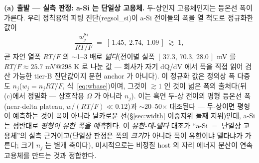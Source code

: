 \textbf{(a) 출발 --- 실측 판정: a-Si 는 단일상 고용체.} 두-상인지 고용체인지는 등온선 폭이 가른다. 우리 정칙용액
피팅 진단(regsol\_si)이 a-Si 전이들의 폭을 열 척도로 정규화한 값이
\begin{equation}
\frac{w_j^{\mathrm{Si}}}{RT/F}\;=\;[\,1.45,\;2.74,\;1.09\,]\;\gtrsim\;1,
\label{eq:sifr-width}
\end{equation}
곧 자연 열폭 $RT/F$ 의 $\sim$1--3 배로 \emph{넓다}(전이별 실폭 $[\,37.3,\,70.3,\,28.0\,]$ mV 를
$RT/F\!\approx\!25.7$ mV$@298$ K 로 나눈 값 --- 회사가 자기 dQ/dV 에서 폭을 직접 읽어 검산 가능한
tier-B 진단값이지 문헌 anchor 가 아니다). 이 정규화 값은 정의상 폭 다중도 $n_j$($w_j{=}n_jRT/F$,
식~\eqref{eq:wbase})이며, 그것이 $\gtrsim1$ 인 것이 넓은 폭의 출처다(뒤 (c)에서 정밀화 --- 상호작용 $\Omega$ 가
아니라 $n_j$). 이는 흑연 두-상 전이의 평형 등온선 폭(near-delta plateau, $w/(RT/F)\!\ll\!0.12$)과 $\sim$20--50$\times$
대조된다 --- 두-상이면 평형이 예측하는 것이 폭이 아니라 날카로운 선(\S\ref{sec:width} 이중지위 둘째 지위)인데,
a-Si 는 정반대로 \emph{평형이 유한 폭을 예측}한다. 이 \emph{유한-대-델타} 대조가 ``a-Si $=$ 단일상 고용체''의
실측 근거이고(단일상 판정은 폭의 \emph{크기}가 아니라 폭이 유한이냐 델타냐가 가른다; 크기 $n_j$ 는 별개 축이다),
미시적으로는 비정질 host 의 자리 에너지 분산이 연속 고용체를 만드는 것과 정합한다\cite{chevrier_dahn2009,artrith2018}.

